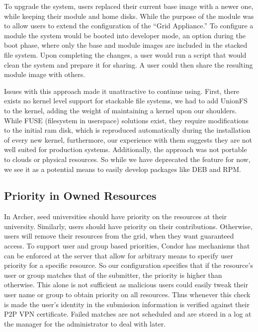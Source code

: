 \documentclass[twocolumn]{svjour3}
\begin{document}
To upgrade the system, users replaced their current base image with a newer
one, while keeping their module and home disks.  While the purpose of the
module was to allow users to extend the configuration of the ``Grid
Appliance.''  To configure a module the system would be booted into developer
mode, an option during the boot phase, where only the base and module images
are included in the stacked file system.  Upon completing the changes, a user
would run a script that would clean the system and prepare it for sharing.  A
user could then share the resulting module image with others.

Issues with this approach made it unattractive to continue using.  First, there
exists no kernel level support for stackable file systems, we had to add
UnionFS~\cite{unionfs} to the kernel, adding the weight of maintaining a kernel
upon our shoulders.  While FUSE (filesystem in userspace) solutions exist, they
require modifications to the initial ram disk, which is reproduced
automatically during the installation of every new kernel, furthermore, our
experience with them suggests they are not well suited for production systems.
Additionally, the approach was not portable to clouds or physical resources.
So while we have deprecated the feature for now, we see it as a potential means
to easily develop packages like DEB and RPM.

\subsection{Priority in Owned Resources}

In Archer, seed universities should have priority on the resources at their
university.  Similarly, users should have priority on their contributions.
Otherwise, users will remove their resources from the grid, when they want
guaranteed access.  To support user and group based priorities, Condor has
mechanisms that can be enforced at the server that allow for arbitrary means to
specify user priority for a specific resource.  So our configuration specifies
that if the resource's user or group matches that of the submitter, the
priority is higher than otherwise.  This alone is not sufficient as malicious
users could easily tweak their user name or group to obtain priority on all
resources.  Thus whenever this check is made the user's identity in the
submission information is verified against their P2P VPN certificate.  Failed
matches are not scheduled and are stored in a log at the manager for the
administrator to deal with later.
\end{document}
